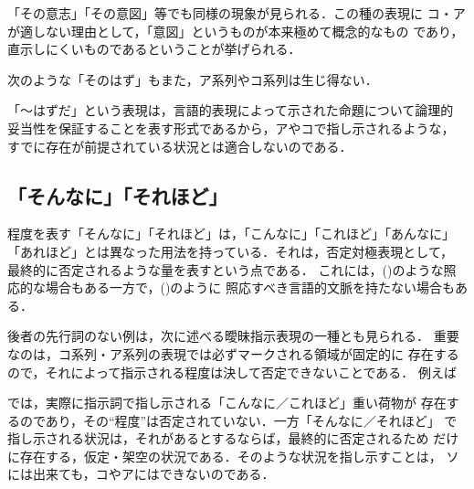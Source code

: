 
「その意志」「その意図」等でも同様の現象が見られる．この種の表現に
コ・アが適しない理由として，「意図」というものが本来極めて概念的なもの
であり，直示しにくいものであるということが挙げられる．

次のような「そのはず」もまた，ア系列やコ系列は生じ得ない．


「〜はずだ」という表現は，言語的表現によって示された命題について論理的
妥当性を保証することを表す形式であるから，アやコで指し示されるような，
すでに存在が前提されている状況とは適合しないのである．

\subsection{「そんなに」「それほど」}
程度を表す「そんなに」「それほど」は，「こんなに」「これほど」「あんなに」
「あれほど」とは異なった用法を持っている．それは，否定対極表現として，
最終的に否定されるような量を表すという点である\cite{hattoritadasi}．
これには，()のような照応的な場合もある一方で，()のように
照応すべき言語的文脈を持たない場合もある．



後者の先行詞のない例は，次に述べる曖昧指示表現の一種とも見られる．
重要なのは，コ系列・ア系列の表現では必ずマークされる領域が固定的に
存在するので，それによって指示される程度は決して否定できないことである．
例えば

では，実際に指示詞で指し示される「こんなに／これほど」重い荷物が
存在するのであり，その``程度''は否定されていない．一方「そんなに／それほど」
で指し示される状況は，それがあるとするならば，最終的に否定されるため
だけに存在する，仮定・架空の状況である．そのような状況を指し示すことは，
ソには出来ても，コやアにはできないのである．

